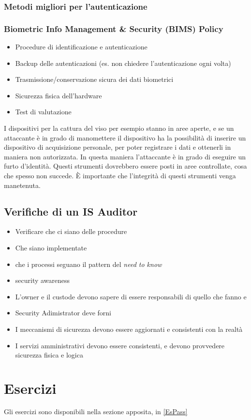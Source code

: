 \subsubsection{Metodi migliori per l'autenticazione}


\subsubsection{Biometric Info Management \& Security (BIMS) Policy}

\begin{itemize}
 \item Procedure di identificazione e autenticazione
 \item Backup delle autenticazioni (es. non chiedere l'autenticazione ogni
 volta)
 \item Trasmissione/conservazione sicura dei dati biometrici
 \item Sicurezza fisica dell'hardware
 \item Test di valutazione
\end{itemize}

I dispositivi per la cattura del viso per esempio stanno in aree aperte, e se
un attaccante è in grado di manomettere il dispositivo ha la possibilità di
inserire un dispositivo di acquisizione personale, per poter registrare i dati
e ottenerli in maniera non autorizzata. In questa maniera l'attaccante è in
grado di eseguire un furto d'identità. Questi strumenti dovrebbero essere posti
in aree controllate, cosa che spesso non succede. È importante che l'integrità
di questi strumenti venga manetenuta.

\subsection{Verifiche di un IS Auditor}
\begin{itemize}
 \item Verificare che ci siano delle procedure
 \item Che siano implementate
 \item che i processi seguano il pattern del \textit{need to know}
 \item security awareness
 \item L'owner e il custode devono sapere di essere responsabili di quello che
 fanno e
 \item Security Adimistrator deve forni
 \item I meccanismi di sicurezza devono essere aggiornati e consistenti con la
 realtà
 \item I servizi amministrativi devono essere consistenti, e devono provvedere
 sicurezza fisica e logica
\end{itemize}

\section{Esercizi}

Gli esercizi sono disponibili nella sezione apposita, in \ref{EsPass}
